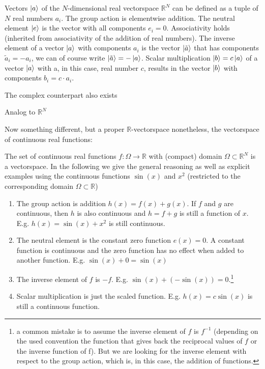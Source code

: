 \begin{ex*}[$\mathbb{R}^N$]
    Vectors $\ket{a}$ of the $N$-dimensional real vectorspace $\mathbb{R}^N$ can be defined as a tuple of $N$ real numbers $a_i$. The group action is elementwise addition. The neutral element $\ket{e}$ is the vector with all components $e_i = 0$. Associativity holds (inherited from associativity of the addition of real numbers). The inverse element of a vector $\ket{a}$ with components $a_i$ is the vector $\ket{\tilde{a}}$ that has components $\tilde{a}_i = -a_i$, we can of course write $\ket{\tilde{a}} = -\ket{a}$. Scalar multiplication $\ket{b} = c\ket{a}$ of a vector $\ket{a}$ with a, in this case, real number $c$, results in the vector $\ket{b}$ with components $b_i = c\cdot  a_i$.
\end{ex*}
The complex counterpart also exists
\begin{ex*}[$\mathbb{C}^N$]
    Analog to $\mathbb{R}^N$
\end{ex*}
Now something different, but a proper $\mathbb{R}$-vectorspace nonetheless, the vectorspace of continuous real functions:
\begin{ex*}[$C(\Omega)$] The set of continuous real functions $f: \Omega \rightarrow \mathbb{R}$ with (compact) domain $\Omega \subset \mathbb{R}^N$ is a vectorspace. In the following we give the general reasoning as well as explicit examples using the continuous functions $\sin(x)$ and $x^2$ (restricted to the corresponding domain $\Omega\subset \mathbb{R}$)
\begin{enumerate}
    \item The group action is addition $h(x) = f(x) + g(x)$. If $f$ and $g$ are continuous, then $h$ is also continuous and $h=f+g$ is still a function of $x$. E.g. $h(x) = \sin(x) + x^2$ is still continuous.
    \item The neutral element is the constant zero function $e(x) = 0$. A constant function is continuous and the zero function has no effect when added to another function. E.g. $\sin(x) + 0 = \sin(x)$
    \item The inverse element of $f$ is $-f$. E.g. $\sin(x) + (-\sin(x)) = 0$.\footnote{a common mistake is to assume the inverse element of $f$ is $f^{-1}$ (depending on the used convention the function that gives back the reciprocal values of $f$ or the inverse function of f). But we are looking for the inverse element with respect to the group action, which is, in this case, the addition of functions.}
    \item Scalar multiplication is just the scaled function. E.g. $h(x) = c\sin(x)$ is still a continuous function.
\end{enumerate}
\end{ex*}
